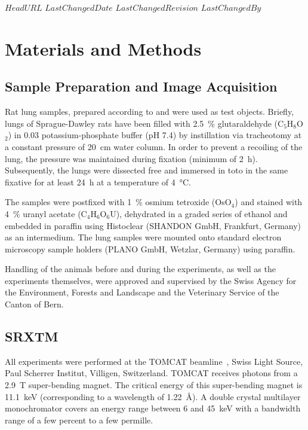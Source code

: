 \svnidlong
{$HeadURL$}
{$LastChangedDate$}
{$LastChangedRevision$}
{$LastChangedBy$}

\ifhtml
\else
\begin{center}
\end{center}
\fi

\section{Materials and Methods}%
\label{sec:materials and methods}%
\subsection{Sample Preparation and Image Acquisition}%
Rat lung samples, prepared according to %
\ifhtml
	\citet{Tschanz2002,Schittny1997}
\else
	 and 
\fi%
were used as test objects. Briefly, lungs of Sprague-Dawley rats have been filled with \SI{2.5}{\%} glutaraldehyde (C$_5$H$_8$O$_2$) in \SI{0.03}{\Molar} potassium-phosphate buffer (pH 7.4) by instillation via tracheotomy at a constant pressure of \SI{20}{\centi\meter} water column. In order to prevent a recoiling of the lung, the pressure was maintained during fixation (minimum of \SI{2}{\hour}). Subsequently, the lungs were dissected free and immersed in toto in the same fixative for at least \SI{24}{\hour} at a temperature of \SI{4}{\celsius}.

The samples were postfixed with \SI{1}{\percent} osmium tetroxide (OsO$_4$) and stained with \SI{4}{\percent} uranyl acetate (C$_4$H$_6$O$_6$U), dehydrated in a graded series of ethanol and embedded in paraffin using Histoclear (SHANDON GmbH, Frankfurt, Germany) as an intermedium. The lung samples were mounted onto standard electron microscopy sample holders (PLANO GmbH, Wetzlar, Germany) using paraffin.

Handling of the animals before and during the experiments, as well as the experiments themselves, were approved and supervised by the Swiss Agency for the Environment, Forests and Landscape and the Veterinary Service of the Canton of Bern.

\subsection{SRXTM}%
All experiments were performed at the TOMCAT beamline~\cite{Stampanoni2006a}, Swiss Light Source, Paul Scherrer Institut, Villigen, Switzerland. TOMCAT receives photons from a \SI{2.9}{\tesla} super-bending magnet. The critical energy of this super-bending magnet is \SI{11.1}{\kilo\electronvolt} (corresponding to a wavelength of \SI{1.22}{\angstrom}). A double crystal multilayer monochromator covers an energy range between 6 and \SI{45}{\kilo\electronvolt} with a bandwidth range of a few percent to a few permille.

